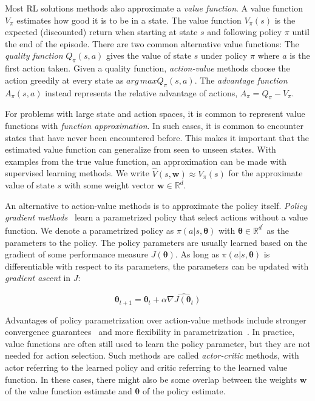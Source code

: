 Most RL solutions methods also approximate a \textit{value function}.
A value function \(V_\pi\) estimates how good it is to be in a state.
The value function \(V_\pi(s)\) is the expected (discounted) return when starting at state \(s\) and following policy \(\pi\) until the end of the episode.
There are two common alternative value functions:
The \textit{quality function} \(Q_\pi(s,a)\) gives the value of state \(s\) under policy \(\pi\) where \(a\) is the first action taken.
Given a quality function, \textit{action-value} methods choose the action greedily at every state as \(arg\,max Q_\pi(s, a)\).
The \textit{advantage function} \(A_\pi(s, a)\) instead represents the relative advantage of actions, \(A_\pi = Q_\pi - V_\pi\).~\cite{sutton_reinforcement_2018}

For problems with large state and action spaces, it is common to represent value functions with \textit{function approximation}.
In such cases, it is common to encounter states that have never been encountered before.
This makes it important that the estimated value function can generalize from seen to unseen states.
With examples from the true value function, an approximation can be made with supervised learning methods.
We write \(\hat{V}(s,\mathbf{w}) \approx V_\pi(s)\) for the approximate value of state \(s\) with some weight vector \(\mathbf{w} \in \mathbb{R}^d\).~\cite{sutton_reinforcement_2018}

An alternative to action-value methods is to approximate the policy itself.
\textit{Policy gradient methods}~\cite{sutton_policygrad_1999} learn a parametrized policy that select actions without a value function.
We denote a parametrized policy as \(\pi(a|s,\boldsymbol{\theta})\) with \(\boldsymbol{\theta} \in \mathbb{R}^{d^\prime}\) as the parameters to the policy.
The policy parameters are usually learned based on the gradient of some performance measure \(J(\boldsymbol{\theta})\).
As long as \(\pi(a|s,\boldsymbol{\theta})\) is differentiable with respect to its parameters, the parameters can be updated with \textit{gradient ascent} in \(J\):

\[
    \boldsymbol{\theta}_{t+1} = \boldsymbol{\theta}_t + \alpha \hat{\nabla J(\boldsymbol{\theta}_t)}
\]

Advantages of policy parametrization over action-value methods include stronger convergence guarantees~\cite{sutton_policygrad_1999} and more flexibility in parametrization~\cite{sutton_reinforcement_2018}.
In practice, value functions are often still used to learn the policy parameter, but they are not needed for action selection.
Such methods are called \textit{actor-critic} methods, with actor referring to the learned policy and critic referring to the learned value function.
In these cases, there might also be some overlap between the weights \(\mathbf{w}\) of the value function estimate and \(\boldsymbol{\theta}\) of the policy estimate. 

